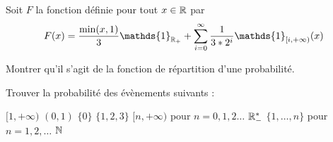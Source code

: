 \documentclass{report}
\begin{document}
\begin{exo}
    Soit \(F\) la fonction définie pour tout \(x\in\mathbb{R}\) par
    \[F(x)=\frac{\min(x,1)}{3}\mathds{1}_{\R_+}
    + \sum_{i=0}^\infty \frac{1}{3*2^i}\mathds{1}_{[i,+\infty)}(x)\]
    \begin{q}{1}
        Montrer qu'il s'agit de la fonction de répartition d'une probabilité.
    \end{q}
    \begin{q}{2}
        Trouver la probabilité des évènements suivants :
        \begin{enumerate}
            \itt \([1,+\infty)\)
            \itt \((0,1)\)
            \itt \(\{0\}\)
            \itt \(\{1,2,3\}\)
            \itt \([n,+\infty)\) pour \(n=0,1,2\dots\)
            \itt \(\mathbb{R}_-^*\)
            \itt \(\{1,\dots,n\}\) pour \(n=1,2,\dots\)
            \itt \(\mathbb{N}\)
        \end{enumerate}
    \end{q}
\end{exo}
\end{document}
